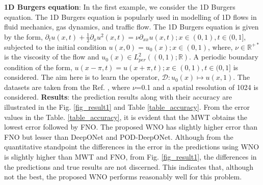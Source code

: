 \documentclass{article}
\begin{document}
\textbf{1D Burgers equation}: In the first example, we consider the 1D Burgers equation. The 1D Burgers equation is popularly used in modelling of 1D flows in fluid mechanics, gas dynamics, and traffic flow. The 1D Burgers equation is given by the form,
$\partial_{t} u(x, t)+\frac{1}{2}\partial_{x}u^{2}(x, t) =\nu \partial_{x x} u(x, t); x \in(0,1), t \in(0,1]$, subjected to the initial condition $u(x, 0) = u_{0}(x); x \in(0,1)$, where, $\nu \in \mathbb{R}^{+*}$ is the viscosity of the flow and $u_{0}(x) \in L^2_{per}\left((0,1); \mathbb{R} \right)$. A periodic boundary condition of the form, $u(x - \pi, t) = u(x + \pi, t); x \in(0,1), t \in(0,1]$ is considered.
The aim here is to learn the operator, $\mathcal{D}: u_{0}(x) \mapsto u(x,1)$. The datasets are taken from the Ref. \cite{li2020fourier}, where $\nu$=0.1 and a spatial resolution of 1024 is considered. 
\textbf{Results}: the prediction results along with their accuracy are illustrated in the Fig. \ref{fig_result1} and Table \ref{table_accuracy}. 
From the error values in the Table. \ref{table_accuracy}, it is evident that the MWT obtains the lowest error followed by FNO. The proposed WNO has slightly higher error than FNO but lesser than DeepONet and POD-DeepONet. Although from the quantitative standpoint the differences in the error in the predictions using WNO is slightly higher than MWT and FNO, from Fig. \ref{fig_result1}, the differences in the predictions and true results are not discerned. This indicates that, although not the best, the proposed WNO performs reasonably well for this problem.
\end{document}

